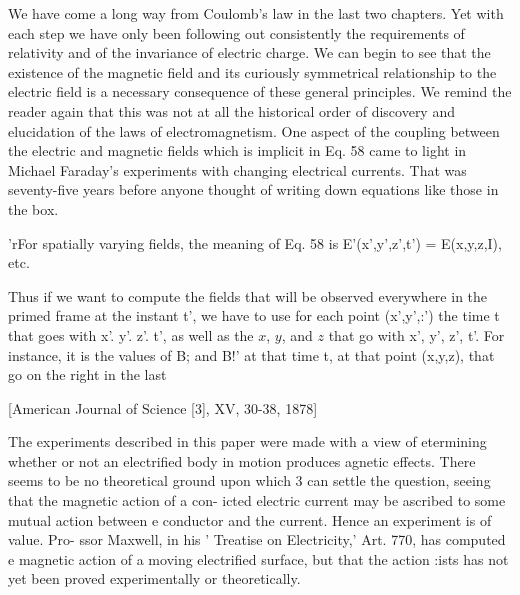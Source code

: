 We have come a long way from Coulomb's law in the last two
chapters. Yet with each step we have only been following out consistently
the requirements of relativity and of the invariance of electric
charge. We can begin to see that the existence of the magnetic
field and its curiously symmetrical relationship to the electric field
is a necessary consequence of these general principles. We remind
the reader again that this was not at all the historical order of discovery
and elucidation of the laws of electromagnetism. One aspect
of the coupling between the electric and magnetic fields which is
implicit in Eq. 58 came to light in Michael Faraday's experiments
with changing electrical currents. That was seventy-five years before
anyone thought of writing down equations like those in the box.

'rFor spatially varying fields, the meaning of Eq. 58 is E'(x',y',z',t') = E(x,y,z,I), etc.

Thus if we want to compute the fields that will be observed everywhere in the primed
frame at the instant t', we have to use for each point (x',y',:') the time t that goes with
x'. y'. z'. t', as well as the $x$, $y$, and $z$ that go with x', y', z', t'. For instance, it is the
values of B; and B!' at that time t, at that point (x,y,z), that go on the right in the last

  

 

 

 

 

[American Journal of Science [3], XV, 30-38, 1878]

The experiments described in this paper were made with a view of
etermining whether or not an electrified body in motion produces
agnetic effects. There seems to be no theoretical ground upon which
3 can settle the question, seeing that the magnetic action of a con-
icted electric current may be ascribed to some mutual action between
e conductor and the current. Hence an experiment is of value. Pro-
ssor Maxwell, in his ' Treatise on Electricity,' Art. 770, has computed
e magnetic action of a moving electrified surface, but that the action
:ists has not yet been proved experimentally or theoretically.

